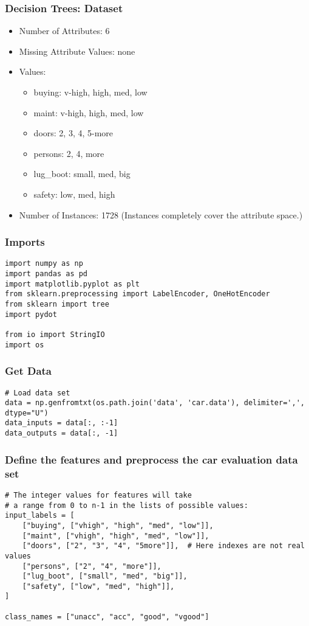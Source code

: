 \begin{frame}[fragile]\frametitle{Decision Trees: Dataset}
\begin{itemize}
\item Number of Attributes: 6
\item Missing Attribute Values: none
\item Values:
		\begin{itemize}
		\item  buying: 	v-high, high, med, low
		\item  maint: 	v-high, high, med, low
		\item  doors: 	2, 3, 4, 5-more
		\item  persons: 	2, 4, more
		\item  lug\_boot: 	small, med, big
		\item  safety:	low, med, high
		\end{itemize}
\item Number of Instances: 1728 (Instances completely cover the attribute space.)
\end{itemize}
\end{frame}

\begin{frame}[fragile]\frametitle{Imports}
\begin{lstlisting}
import numpy as np
import pandas as pd
import matplotlib.pyplot as plt
from sklearn.preprocessing import LabelEncoder, OneHotEncoder
from sklearn import tree
import pydot

from io import StringIO
import os
\end{lstlisting}
\end{frame}



\begin{frame}[fragile]\frametitle{Get Data}
\begin{lstlisting}
# Load data set
data = np.genfromtxt(os.path.join('data', 'car.data'), delimiter=',', dtype="U")
data_inputs = data[:, :-1]
data_outputs = data[:, -1]
\end{lstlisting}
\end{frame}

\begin{frame}[fragile]\frametitle{Define the features and preprocess the car evaluation data set}
\begin{lstlisting}
# The integer values for features will take
# a range from 0 to n-1 in the lists of possible values:
input_labels = [
    ["buying", ["vhigh", "high", "med", "low"]],
    ["maint", ["vhigh", "high", "med", "low"]],
    ["doors", ["2", "3", "4", "5more"]],  # Here indexes are not real values
    ["persons", ["2", "4", "more"]],
    ["lug_boot", ["small", "med", "big"]],
    ["safety", ["low", "med", "high"]],
]

class_names = ["unacc", "acc", "good", "vgood"]
\end{lstlisting}
\end{frame}

